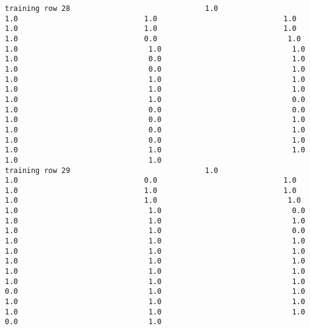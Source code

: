 \documentclass[11pt]{article}
\begin{document}
\begin{verbatim}
training row 28                               1.0                             1.0                             1.0                             1.0                             1.0                             1.0                             1.0                             1.0                             0.0                              1.0                              1.0                              1.0                              1.0                              1.0                              0.0                              1.0                              1.0                              0.0                              1.0                              1.0                              1.0                              1.0                              1.0                              1.0                              1.0                              1.0                              1.0                              0.0                              1.0                              0.0                              0.0                              1.0                              0.0                              1.0                              1.0                              0.0                              1.0                              1.0                              0.0                              1.0                              1.0                              1.0                              1.0                              1.0                              1.0
training row 29                               1.0                             1.0                             0.0                             1.0                             1.0                             1.0                             1.0                             1.0                             1.0                              1.0                              1.0                              1.0                              0.0                              1.0                              1.0                              1.0                              1.0                              1.0                              0.0                              1.0                              1.0                              1.0                              1.0                              1.0                              1.0                              1.0                              1.0                              1.0                              1.0                              1.0                              1.0                              1.0                              1.0                              1.0                              0.0                              1.0                              1.0                              1.0                              1.0                              1.0                              1.0                              1.0                              1.0                              0.0                              1.0

\end{verbatim}
\end{document}
